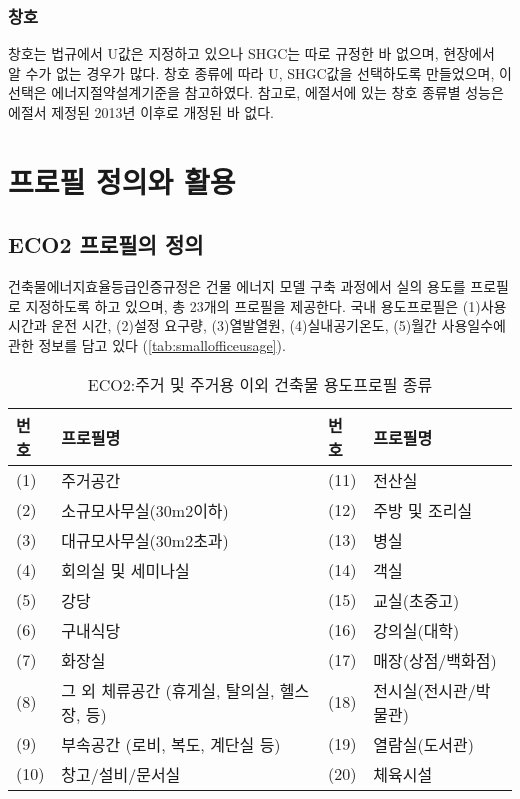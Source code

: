 \subsubsection{창호}
창호는 법규에서 U값은 지정하고 있으나 SHGC는 따로 규정한 바 없으며, 현장에서 알 수가 없는 경우가 많다. 
창호 종류에 따라 U, SHGC값을 선택하도록 만들었으며, 이 선택은 에너지절약설계기준을 참고하였다. 참고로, 에절서에 있는 창호 종류별 성능은 에절서 제정된 2013년 이후로 개정된 바 없다.



\section{프로필 정의와 활용}
\subsection{ECO2 프로필의 정의}
건축물에너지효율등급인증규정은 건물 에너지 모델 구축 과정에서 실의 용도를 프로필로 지정하도록 하고 있으며, 총 23개의 프로필을 제공한다\cite{law:usageprofile}. 국내 용도프로필은 (1)사용시간과 운전 시간, (2)설정 요구량, (3)열발열원, (4)실내공기온도, (5)월간 사용일수에 관한 정보를 담고 있다 (\cref{tab:smallofficeusage}). 

\begin{table}[ht]
  \caption{ECO2:주거 및 주거용 이외 건축물 용도프로필 종류}
  \label{tbl:eco2profiles}  
  \centering
  \begin{tabular}{llll}
    \toprule
    번호 & 프로필명 & 번호 & 프로필명 \\ \midrule
    (1) & 주거공간             & (11) & 전산실 \\ \midrule
    (2) & 소규모사무실(30m2이하) & (12) & 주방 및 조리실 \\ \midrule
    (3) & 대규모사무실(30m2초과) & (13) & 병실 \\ \midrule
    (4) & 회의실 및 세미나실     & (14) & 객실 \\ \midrule
    (5) & 강당                & (15) & 교실(초중고) \\ \midrule
    (6) & 구내식당             & (16) & 강의실(대학) \\ \midrule
    (7) & 화장실               & (17) & 매장(상점/백화점) \\ \midrule
    (8) & 그 외 체류공간 (휴게실, 탈의실, 헬스장, 등) & (18) & 전시실(전시관/박물관) \\ \midrule
    (9) & 부속공간 (로비, 복도, 계단실 등) & (19) & 열람실(도서관) \\ \midrule
    (10) & 창고/설비/문서실     & (20) & 체육시설 \\ \bottomrule
  \end{tabular}
\end{table}



